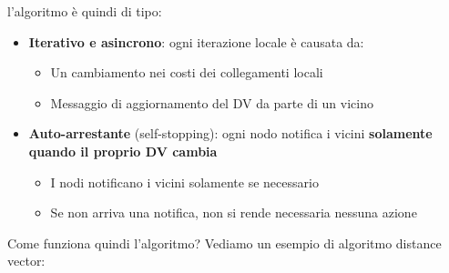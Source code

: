 \documentclass[12pt]{article}
\begin{document}
l'algoritmo è quindi di tipo:
\begin{itemize}
    \item \textbf{Iterativo e asincrono}: ogni iterazione locale è causata da:
    \begin{itemize}
        \item Un cambiamento nei costi dei collegamenti locali
        \item Messaggio di aggiornamento del DV da parte di un vicino
    \end{itemize}
    \item \textbf{Auto-arrestante} (self-stopping): ogni nodo notifica i vicini \textbf{solamente quando il proprio DV cambia}
    \begin{itemize}
        \item I nodi notificano i vicini solamente se necessario
        \item Se non arriva una notifica, non si rende necessaria nessuna azione
    \end{itemize} 
\end{itemize}
Come funziona quindi l'algoritmo? Vediamo un esempio di algoritmo distance vector:
\end{document}
